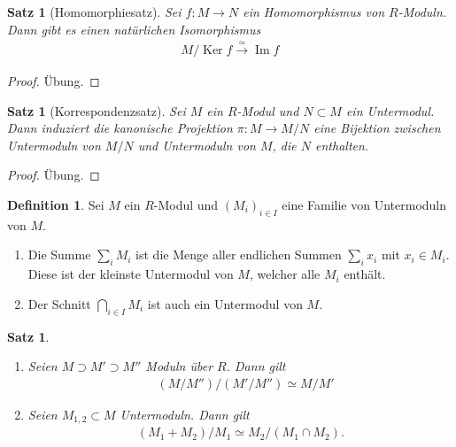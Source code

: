 \documentclass[reqno,12pt]{article}
\numberwithin{equation}{section}
\newcommand{\iso}{\simeq}
\newcommand{\Ker}{\text{Ker }}
\renewcommand{\Im}{\text{Im }}
\theoremstyle{plain}
\newtheorem{proposition}[thm]{Satz}
\theoremstyle{definition}
\newtheorem{definition}[thm]{Definition}
\renewcommand{\Ker}{\operatorname{Ker}}
\renewcommand{\Im}{\operatorname{Im}}
\begin{document}
\begin{proposition}[Homomorphiesatz]
Sei $f \colon M \to N$ ein Homomorphismus von $R$-Moduln. Dann gibt es einen natürlichen Isomorphismus
\begin{align*}
  M/\Ker f \overset{\simeq}{\to} \Im f
\end{align*}
\end{proposition}

\begin{proof}
Übung.
\end{proof}


\begin{proposition}[Korrespondenzsatz]
  Sei $M$ ein $R$-Modul und $N \subset M$ ein Untermodul. Dann induziert die kanonische Projektion $\pi \colon M \to M/N$ eine Bijektion zwischen Untermoduln von $M/N$ und Untermoduln von $M$, die $N$ enthalten.
\end{proposition}

\begin{proof}
Übung.
\end{proof}


\begin{definition}
Sei $M$ ein $R$-Modul und $(M_i)_{i \in I}$ eine Familie von Untermoduln von $M$.
\begin{enumerate}
  \item Die {\sf Summe} $\sum_i M_i$ ist die Menge aller endlichen Summen $\sum_i x_i$ mit $x_i \in M_i$. Diese ist der kleinste Untermodul von $M$, welcher alle $M_i$ enthält.

  \item Der {\sf Schnitt} $\bigcap_{i \in I} M_i$ ist auch ein Untermodul von $M$.
\end{enumerate}

\end{definition}

\begin{proposition}
\
\begin{enumerate}
  \item Seien $M \supset M' \supset M''$ Moduln über $R$. Dann gilt
  \begin{align*}
  & (M/M'')/(M'/M'') \iso M/M'
  \end{align*}

  \item Seien $M_{1,2} \subset M$ Untermoduln. Dann gilt
  \begin{align*}
   \left( M_1 + M_2 \right) /M_1 \iso M_2/(M_1 \cap M_2).
  \end{align*}
\end{enumerate}

\end{proposition}
\end{document}

